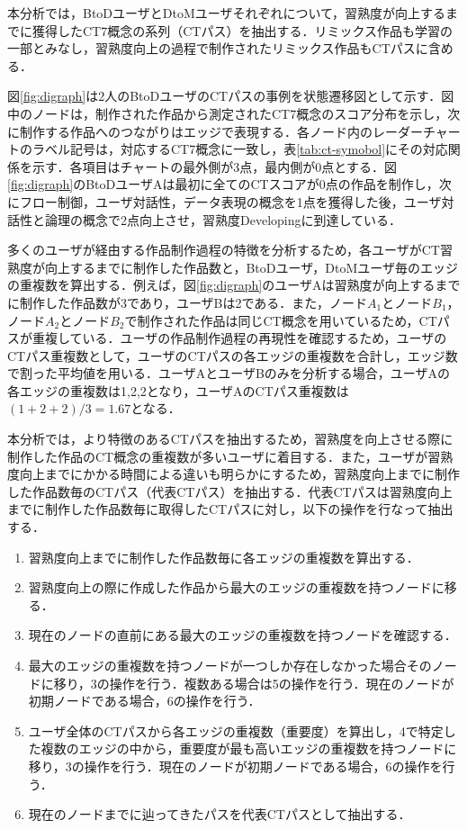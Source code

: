 \documentclass[11pt,dvipdfmx]{jreport}
\begin{document}
本分析では，BtoDユーザとDtoMユーザそれぞれについて，習熟度が向上するまでに獲得したCT7概念の系列（CTパス）を抽出する．リミックス作品も学習の一部とみなし，習熟度向上の過程で制作されたリミックス作品もCTパスに含める．

図\ref{fig:digraph}は2人のBtoDユーザのCTパスの事例を状態遷移図として示す．図中のノードは，制作された作品から測定されたCT7概念のスコア分布を示し，次に制作する作品へのつながりはエッジで表現する．各ノード内のレーダーチャートのラベル記号は，対応するCT7概念に一致し，表\ref{tab:ct-symobol}にその対応関係を示す．各項目はチャートの最外側が3点，最内側が0点とする．図\ref{fig:digraph}のBtoDユーザAは最初に全てのCTスコアが0点の作品を制作し，次にフロー制御，ユーザ対話性，データ表現の概念を1点を獲得した後，ユーザ対話性と論理の概念で2点向上させ，習熟度Developingに到達している．

多くのユーザが経由する作品制作過程の特徴を分析するため，各ユーザがCT習熟度が向上するまでに制作した作品数と，BtoDユーザ，DtoMユーザ毎のエッジの重複数を算出する．例えば，図\ref{fig:digraph}のユーザAは習熟度が向上するまでに制作した作品数が3であり，ユーザBは2である．また，ノード$A_1$とノード$B_1$，ノード$A_2$とノード$B_2$で制作された作品は同じCT概念を用いているため，CTパスが重複している．ユーザの作品制作過程の再現性を確認するため，ユーザのCTパス重複数として，ユーザのCTパスの各エッジの重複数を合計し，エッジ数で割った平均値を用いる．ユーザAとユーザBのみを分析する場合，ユーザAの各エッジの重複数は1,2,2となり，ユーザAのCTパス重複数は$(1 + 2 + 2) / 3 = 1.67$となる．

本分析では，より特徴のあるCTパスを抽出するため，習熟度を向上させる際に制作した作品のCT概念の重複数が多いユーザに着目する．また，ユーザが習熟度向上までにかかる時間による違いも明らかにするため，習熟度向上までに制作した作品数毎のCTパス（代表CTパス）を抽出する．代表CTパスは習熟度向上までに制作した作品数毎に取得したCTパスに対し，以下の操作を行なって抽出する．
\begin{enumerate}
    \item 習熟度向上までに制作した作品数毎に各エッジの重複数を算出する．
    \item 習熟度向上の際に作成した作品から最大のエッジの重複数を持つノードに移る．
    \item 現在のノードの直前にある最大のエッジの重複数を持つノードを確認する．
    \item 最大のエッジの重複数を持つノードが一つしか存在しなかった場合そのノードに移り，3の操作を行う．複数ある場合は5の操作を行う．現在のノードが初期ノードである場合，6の操作を行う．
    \item ユーザ全体のCTパスから各エッジの重複数（重要度）を算出し，4で特定した複数のエッジの中から，重要度が最も高いエッジの重複数を持つノードに移り，3の操作を行う．現在のノードが初期ノードである場合，6の操作を行う．
    \item 現在のノードまでに辿ってきたパスを代表CTパスとして抽出する．
\end{enumerate}
\end{document}
